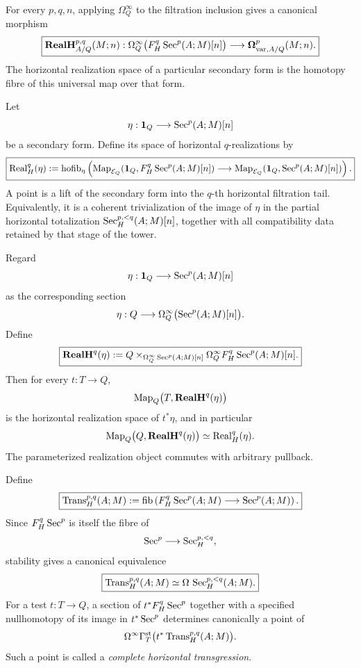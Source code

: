 \begin{construction}
\label{con:var-universal-horizontal-realization}
For every \(p,q,n\), applying \(\Omega_Q^\infty\) to the filtration inclusion gives a canonical morphism
\[
    \boxed{
    \mathbf{RealH}^{p,q}_{A/Q}(M;n):
    \Omega_Q^\infty\bigl(F_H^q\operatorname{Sec}^p(A;M)[n]\bigr)
    \longrightarrow
    \boldsymbol\Omega^p_{\mathrm{var},A/Q}(M;n).
    }
\]
The horizontal realization space of a particular secondary form is the homotopy fibre of this universal map over that form.
\end{construction}

\begin{definition}
\label{def:var-horizontal-realization}
Let
\[
    \eta:\mathbf 1_Q\longrightarrow\operatorname{Sec}^p(A;M)[n]
\]
be a secondary form. Define its space of horizontal \(q\)-realizations by
\[
    \boxed{
    \operatorname{Real}_{H}^q(\eta)
    :=
    \operatorname{hofib}_{\eta}\left(
      \operatorname{Map}_{\mathcal E_Q}
      (\mathbf 1_Q,F_H^q\operatorname{Sec}^p(A;M)[n])
      \longrightarrow
      \operatorname{Map}_{\mathcal E_Q}
      (\mathbf 1_Q,\operatorname{Sec}^p(A;M)[n])
    \right).
    }
\]
A point is a lift of the secondary form into the \(q\)-th horizontal filtration tail. Equivalently, it is a coherent trivialization of the image of \(\eta\) in the partial horizontal totalization \(\operatorname{Sec}_H^{p,<q}(A;M)[n]\), together with all compatibility data retained by that stage of the tower.
\end{definition}

\begin{definition}
\label{def:var-parameterized-horizontal-realization}
Regard
\[
    \eta:\mathbf 1_Q\longrightarrow\operatorname{Sec}^p(A;M)[n]
\]
as the corresponding section
\[
    \eta:Q\longrightarrow
    \Omega_Q^\infty\bigl(\operatorname{Sec}^p(A;M)[n]\bigr).
\]
Define
\[
    \boxed{
    \mathbf{RealH}^{q}(\eta)
    :=
    Q
    \times_{\Omega_Q^\infty\operatorname{Sec}^p(A;M)[n]}
    \Omega_Q^\infty F_H^q\operatorname{Sec}^p(A;M)[n].
    }
\]
Then for every \(t:T\to Q\),
\[
    \operatorname{Map}_Q\bigl(T,\mathbf{RealH}^{q}(\eta)\bigr)
\]
is the horizontal realization space of \(t^*\eta\), and in particular
\[
    \operatorname{Map}_Q\bigl(Q,\mathbf{RealH}^{q}(\eta)\bigr)
    \simeq
    \operatorname{Real}_{H}^q(\eta).
\]
The parameterized realization object commutes with arbitrary pullback.
\end{definition}

\begin{definition}
\label{def:var-horizontal-transgression}
Define
\[
    \boxed{
    \operatorname{Trans}_{H}^{p,q}(A;M)
    :=
    \operatorname{fib}\left(
      F_H^q\operatorname{Sec}^p(A;M)
      \longrightarrow
      \operatorname{Sec}^p(A;M)
    \right).
    }
\]
Since \(F_H^q\operatorname{Sec}^p\) is itself the fibre of
\[
    \operatorname{Sec}^p\longrightarrow\operatorname{Sec}_H^{p,<q},
\]
stability gives a canonical equivalence
\[
    \boxed{
    \operatorname{Trans}_{H}^{p,q}(A;M)
    \simeq
    \Omega\,\operatorname{Sec}_H^{p,<q}(A;M).
    }
\]
For a test \(t:T\to Q\), a section of \(t^*F_H^q\operatorname{Sec}^p\) together with a specified nullhomotopy of its image in \(t^*\operatorname{Sec}^p\) determines canonically a point of
\[
    \Omega^\infty
    \Gamma_T^{\mathrm{st}}
    \bigl(t^*\operatorname{Trans}_{H}^{p,q}(A;M)\bigr).
\]
Such a point is called a \emph{complete horizontal transgression}.
\end{definition}

